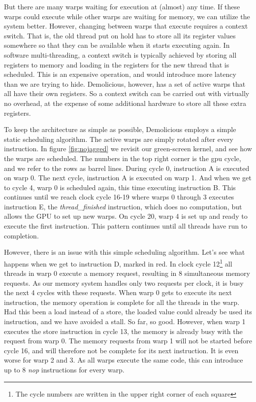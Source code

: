 \documentclass[../main/report.tex]{subfiles}
\begin{document}
But there are many warps waiting for execution at (almost) any time.
If these warps could execute while other warps are waiting for memory, we can utilize the system better.
However, changing between warps that execute requires a context switch.
That is, the old thread put on hold has to store all its register values somewhere so that they can be available when it starts executing again.
In software multi-threading, a context switch is typically achieved by storing all registers to memory and loading in the registers for the new thread that is scheduled.
This is an expensive operation, and would introduce more latency than we are trying to hide.
Demolicious, however, has a set of active warps that all have their own registers.
So a context switch can be carried out with virtually no overhead, at the expense of some additional hardware to store all these extra registers.

To keep the architecture as simple as possible, Demolicious employs a simple static scheduling algorithm.
The active warps are simply rotated after every instruction. In figure \ref{fig:nojagged} we revisit our green-screen kernel, and see how the warps are scheduled.
The numbers in the top right corner is the gpu cycle, and we refer to the rows as barrel lines.
During cycle 0, instruction A is executed on warp 0.
The next cycle, instruction A is executed on warp 1.
And when we get to cycle 4, warp 0 is scheduled again, this time executing instruction B.
This continues until we reach clock cycle 16-19 where warps 0 through 3 executes instruction E, the \emph{thread\_finished} instruction, which does no computation, but allows the GPU to set up new warps.
On cycle 20, warp 4 is set up and ready to execute the first instruction.
This pattern continues until all threads have run to completion.

However, there is an issue with this simple scheduling algorithm.
Let's see what happens when we get to instruction D, marked in red.
In clock cycle 12\footnote{The cycle numbers are written in the upper right corner of each square} all threads in warp 0 execute a memory request, resulting in 8 simultaneous memory requests.
As our memory system handles only two requests per clock,
it is busy the next 4 cycles with these requests.
When warp 0 gets to execute its next instruction, the memory operation is complete for all the threads in the warp.
Had this been a load instead of a store, the loaded value could already be used its instruction, and we have avoided a stall.
So far, so good.
However, when warp 1 executes the store instruction in cycle 13, the memory is already busy with the request from warp 0.
The memory requests from warp 1 will not be started before cycle 16, and will therefore not be complete for its next instruction.
It is even worse for warp 2 and 3. As all warps execute the same code, this can introduce up to 8 \emph{nop} instructions for every warp.
\end{document}
